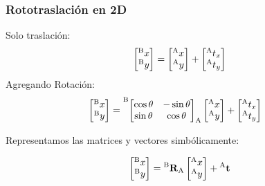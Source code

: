 \begin{frame}
    \frametitle{Rototraslación en 2D}
\scriptsize
Solo traslación:
    \begin{equation*}
        \begin{bmatrix}
            \toCoord{x}{B}\\
            \toCoord{y}{B}
        \end{bmatrix} =
        \begin{bmatrix}
            \toCoord{x}{A}\\
            \toCoord{y}{A}
        \end{bmatrix} +
        \begin{bmatrix}
            \toCoord{t_{x}}{A}\\
            \toCoord{t_{y}}{A}
        \end{bmatrix}
    \end{equation*}
Agregando Rotación:
    \begin{align*}
        \begin{bmatrix}
            \toCoord{x}{B}\\
            \toCoord{y}{B}
        \end{bmatrix} &=
       \toCoord{\fromCoord{\begin{bmatrix}
                                \cos \theta & -\sin \theta \\
                                \sin \theta & \cos \theta
                            \end{bmatrix}}{A}}{B}
        \begin{bmatrix}
            \toCoord{x}{A}\\
            \toCoord{y}{A}
        \end{bmatrix} +
        \begin{bmatrix}
            \toCoord{t_{x}}{A}\\
            \toCoord{t_{y}}{A}
        \end{bmatrix}
    \end{align*}

Representamos las matrices y vectores simbólicamente:

    \begin{equation*}
        \begin{bmatrix}
            \toCoord{x}{B}\\
            \toCoord{y}{B}\\
        \end{bmatrix} = \rotationCoord{B}{A}
        \begin{bmatrix}
            \toCoord{x}{A}\\
            \toCoord{y}{A}
        \end{bmatrix} + \toCoord{\translation}{A}
    \end{equation*}



\end{frame}
